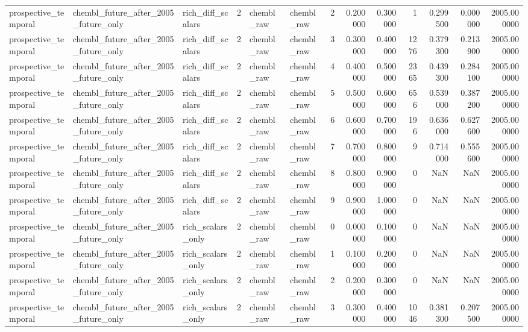 \begin{longtable}{lllrllrrrrrrr}
prospective\_temporal & chembl\_future\_after\_2005\_future\_only & rich\_diff\_scalars & 2 & chembl\_raw & chembl\_raw & 2 & 0.200000 & 0.300000 & 1 & 0.299500 & 0.000000 & 2005.000000 \\
prospective\_temporal & chembl\_future\_after\_2005\_future\_only & rich\_diff\_scalars & 2 & chembl\_raw & chembl\_raw & 3 & 0.300000 & 0.400000 & 1276 & 0.379300 & 0.213900 & 2005.000000 \\
prospective\_temporal & chembl\_future\_after\_2005\_future\_only & rich\_diff\_scalars & 2 & chembl\_raw & chembl\_raw & 4 & 0.400000 & 0.500000 & 2365 & 0.439300 & 0.284100 & 2005.000000 \\
prospective\_temporal & chembl\_future\_after\_2005\_future\_only & rich\_diff\_scalars & 2 & chembl\_raw & chembl\_raw & 5 & 0.500000 & 0.600000 & 656 & 0.539000 & 0.387200 & 2005.000000 \\
prospective\_temporal & chembl\_future\_after\_2005\_future\_only & rich\_diff\_scalars & 2 & chembl\_raw & chembl\_raw & 6 & 0.600000 & 0.700000 & 196 & 0.636000 & 0.627600 & 2005.000000 \\
prospective\_temporal & chembl\_future\_after\_2005\_future\_only & rich\_diff\_scalars & 2 & chembl\_raw & chembl\_raw & 7 & 0.700000 & 0.800000 & 9 & 0.714000 & 0.555600 & 2005.000000 \\
prospective\_temporal & chembl\_future\_after\_2005\_future\_only & rich\_diff\_scalars & 2 & chembl\_raw & chembl\_raw & 8 & 0.800000 & 0.900000 & 0 & NaN & NaN & 2005.000000 \\
prospective\_temporal & chembl\_future\_after\_2005\_future\_only & rich\_diff\_scalars & 2 & chembl\_raw & chembl\_raw & 9 & 0.900000 & 1.000000 & 0 & NaN & NaN & 2005.000000 \\
prospective\_temporal & chembl\_future\_after\_2005\_future\_only & rich\_scalars\_only & 2 & chembl\_raw & chembl\_raw & 0 & 0.000000 & 0.100000 & 0 & NaN & NaN & 2005.000000 \\
prospective\_temporal & chembl\_future\_after\_2005\_future\_only & rich\_scalars\_only & 2 & chembl\_raw & chembl\_raw & 1 & 0.100000 & 0.200000 & 0 & NaN & NaN & 2005.000000 \\
prospective\_temporal & chembl\_future\_after\_2005\_future\_only & rich\_scalars\_only & 2 & chembl\_raw & chembl\_raw & 2 & 0.200000 & 0.300000 & 0 & NaN & NaN & 2005.000000 \\
prospective\_temporal & chembl\_future\_after\_2005\_future\_only & rich\_scalars\_only & 2 & chembl\_raw & chembl\_raw & 3 & 0.300000 & 0.400000 & 1046 & 0.381300 & 0.207500 & 2005.000000 \\

\end{longtable}
